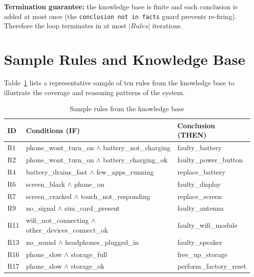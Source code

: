 \documentclass[12pt,a4paper]{article}
\begin{document}
\textbf{Termination guarantee:} the knowledge base is finite and each conclusion
is added at most once (the \texttt{conclusion not in facts} guard prevents
re-firing). Therefore the loop terminates in at most $|Rules|$ iterations.

\section{Sample Rules and Knowledge Base}

Table~\ref{tab:samplerules} lists a representative sample of ten rules from the
knowledge base to illustrate the coverage and reasoning patterns of the system.

\begin{table}[h]
\centering
\caption{Sample rules from the knowledge base}
\label{tab:samplerules}
\small
\begin{tabular}{p{0.6cm} p{5.5cm} p{5.5cm}}
\toprule
\textbf{ID} & \textbf{Conditions (IF)} & \textbf{Conclusion (THEN)} \\
\midrule
R1  & phone\_wont\_turn\_on $\wedge$ battery\_not\_charging       & faulty\_battery \\
R2  & phone\_wont\_turn\_on $\wedge$ battery\_charging\_ok        & faulty\_power\_button \\
R4  & battery\_drains\_fast $\wedge$ few\_apps\_running           & replace\_battery \\
R6  & screen\_black $\wedge$ phone\_on                            & faulty\_display \\
R7  & screen\_cracked $\wedge$ touch\_not\_responding             & replace\_screen \\
R9  & no\_signal $\wedge$ sim\_card\_present                      & faulty\_antenna \\
R11 & wifi\_not\_connecting $\wedge$ other\_devices\_connect\_ok  & faulty\_wifi\_module \\
R13 & no\_sound $\wedge$ headphones\_plugged\_in                  & faulty\_speaker \\
R16 & phone\_slow $\wedge$ storage\_full                          & free\_up\_storage \\
R17 & phone\_slow $\wedge$ storage\_ok                            & perform\_factory\_reset \\
\bottomrule
\end{tabular}
\end{table}
\end{document}

